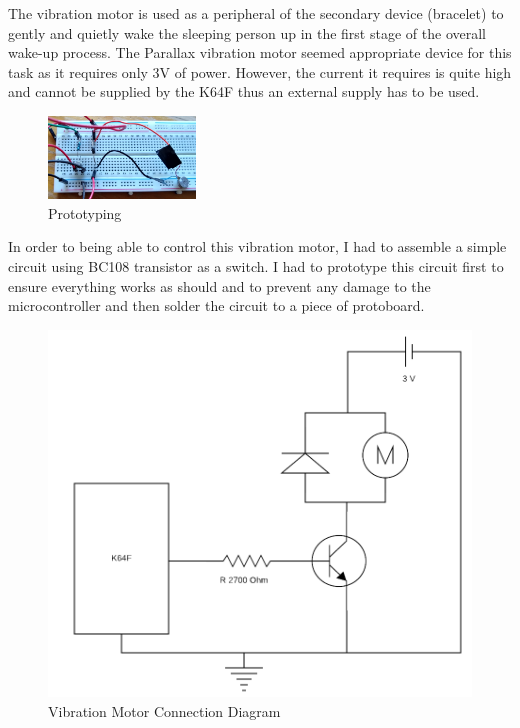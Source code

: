 \documentclass[12pt,a4paper]{article}
\begin{document}
		The vibration motor is used as a peripheral of the secondary device (bracelet) to gently and quietly wake the sleeping person up in the first stage of the overall wake-up process. The Parallax vibration motor seemed appropriate device for this task as it requires only 3V of power. However, the current it requires is quite high and cannot be supplied by the K64F thus an external supply has to be used.\\
		
		
        \begin{figure}
         \centering
         \includegraphics[width=0.35\textwidth]{circuit_proto.jpg}
         \caption{Prototyping}
        \end{figure}
        
        In order to being able to control this vibration motor, I had to assemble a simple circuit using BC108 transistor as a switch. I had to prototype this circuit first to ensure everything works as should and to prevent any damage to the microcontroller and then solder the circuit to a piece of protoboard.\\
        
		\begin{figure}[h]
			\centering
			\includegraphics[scale=0.3]{motor_diag1.png}
			\caption{Vibration Motor Connection Diagram}
			\label{fig:vibMotorConnDiag}
		\end{figure}
        
\end{document}
